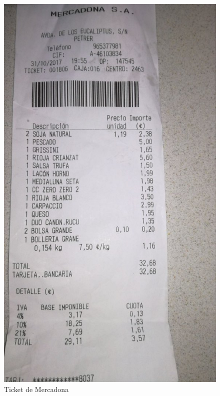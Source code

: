 \documentclass{article}
\begin{document}
\begin{figure}[h]
    \centering
    \begin{minipage}[h]{0.32\textwidth}
        \includegraphics[width=\textwidth]{imagenes/funcionamiento/ticket1.jpg}
        \caption{Ticket de Mercadona}
    \end{minipage}
    \hfill
    \begin{minipage}[h]{0.32\textwidth}

\end{minipage}
\end{figure}
\end{document}
